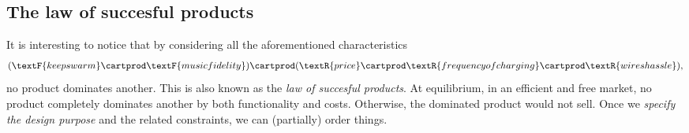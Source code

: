 \subsection{The law of succesful products}
It is interesting to notice that by considering all the aforementioned characteristics
\begin{equation*}
    (\textF{keeps warm}\cartprod \textF{music fidelity})
    \cartprod (\textR{price}\cartprod \textR{frequency of charging}\cartprod \textR{wires hassle}),
\end{equation*}
no product dominates another.
This is also known as the \emph{law of succesful products}.
At equilibrium, in an efficient and free market, no product completely dominates another by both functionality and costs.
Otherwise, the dominated product would not sell.
Once we \emph{specify the design purpose} and the related constraints, we can (partially) order things.

